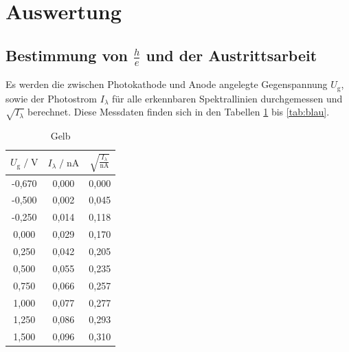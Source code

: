 \section{Auswertung}
\label{sec:Auswertung}

\subsection{Bestimmung von $\frac{h}{e}$ und der Austrittsarbeit}

Es werden die zwischen Photokathode und Anode angelegte Gegenspannung $U_\text{g}$, sowie der 
Photostrom $I_\lambda$ für alle erkennbaren Spektrallinien durchgemessen und $\sqrt{I_\lambda}$ berechnet. 
Diese Messdaten finden sich in den Tabellen \ref{tab:gelb} bis \ref{tab:blau}. 

\begin{table}
    \centering
    \caption{Gelb}
    \label{tab:gelb}
    \begin{tabular}{c c c}
    \toprule
    $ U_\text{g} \;/\; \si{\volt} $ & $I_\lambda \;/\; \si{\nano\ampere}$ &
    $ \sqrt{\frac{I_\lambda}{\si{\nano\ampere}}}$\\
    \midrule 
      -0,670 & 0,000 & 0,000\\
      -0,500 & 0,002 & 0,045\\
      -0,250 & 0,014 & 0,118\\
       0,000 & 0,029 & 0,170\\
       0,250 & 0,042 & 0,205\\
       0,500 & 0,055 & 0,235\\
       0,750 & 0,066 & 0,257\\
       1,000 & 0,077 & 0,277\\
       1,250 & 0,086 & 0,293\\
       1,500 & 0,096 & 0,310\\        
    \bottomrule
    \end{tabular}
\end{table}

